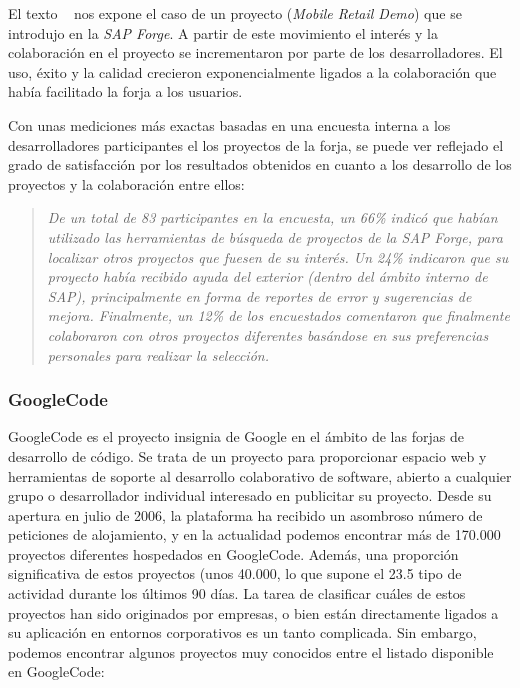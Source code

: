 \par El texto ~\cite{open-collaboration-forges} nos expone el caso de un proyecto (\emph{Mobile Retail Demo}) que se introdujo en la \emph{SAP Forge}. A partir de este movimiento el interés y la colaboración en el proyecto se incrementaron por parte de los desarrolladores. El uso, éxito y la calidad crecieron exponencialmente ligados a la colaboración que había facilitado la forja a los usuarios.

\par Con unas mediciones más exactas basadas en una encuesta interna a los desarrolladores participantes el los proyectos de la forja, se puede ver reflejado el grado de satisfacción por los resultados obtenidos en cuanto a los desarrollo de los proyectos y la colaboración entre ellos:

\begin{quotation}
    \emph{De un total de 83 participantes en la encuesta, un 66\% indicó que habían utilizado las herramientas de búsqueda de proyectos de la \emph{SAP Forge}, para localizar otros proyectos que fuesen de su interés. Un 24\% indicaron que su proyecto había recibido ayuda del exterior (dentro del ámbito interno de SAP), principalmente en forma de reportes de error y sugerencias de mejora. Finalmente, un 12\% de los encuestados comentaron que finalmente colaboraron con otros proyectos diferentes basándose en sus preferencias personales para realizar la selección.}
\end{quotation}

\subsubsection{GoogleCode}
\label{subsub:googlecode}

GoogleCode es el proyecto insignia de Google en el ámbito de las forjas de desarrollo de
código. Se trata de un proyecto para proporcionar espacio web y herramientas de soporte
al desarrollo colaborativo de software, abierto a cualquier grupo o desarrollador individual
interesado en publicitar su proyecto.
Desde su apertura en julio de 2006, la plataforma ha recibido un asombroso número de
peticiones de alojamiento, y en la actualidad podemos encontrar más de 170.000
proyectos diferentes hospedados en GoogleCode. Además, una proporción significativa
de estos proyectos (unos 40.000, lo que supone el 23.5%
tipo de actividad durante los últimos 90 días.
La tarea de clasificar cuáles de estos proyectos han sido originados por empresas, o bien
están directamente ligados a su aplicación en entornos corporativos es un tanto
complicada. Sin embargo, podemos encontrar algunos proyectos muy conocidos entre el
listado disponible en GoogleCode:

